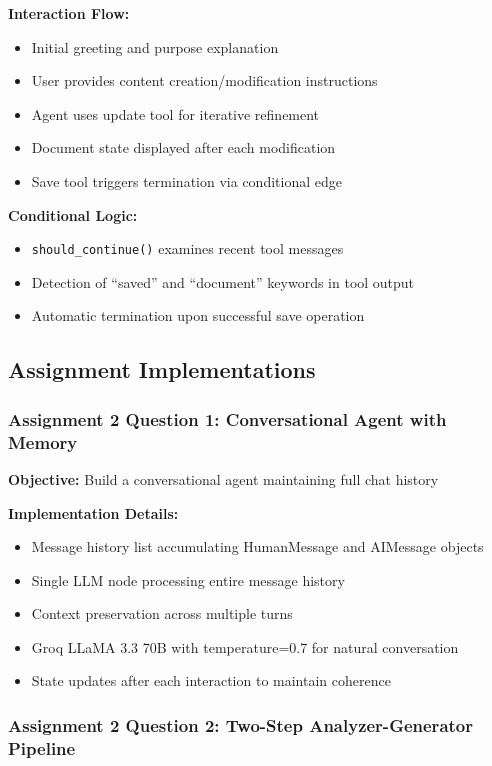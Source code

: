 \documentclass[12pt,a4paper]{article}
\begin{document}
\textbf{Interaction Flow:}
\begin{itemize}
    \item Initial greeting and purpose explanation
    \item User provides content creation/modification instructions
    \item Agent uses update tool for iterative refinement
    \item Document state displayed after each modification
    \item Save tool triggers termination via conditional edge
\end{itemize}

\textbf{Conditional Logic:}
\begin{itemize}
    \item \texttt{should\_continue()} examines recent tool messages
    \item Detection of ``saved'' and ``document'' keywords in tool output
    \item Automatic termination upon successful save operation
\end{itemize}

\subsection{Assignment Implementations}

\subsubsection{Assignment 2 Question 1: Conversational Agent with Memory}

\textbf{Objective:} Build a conversational agent maintaining full chat history

\textbf{Implementation Details:}
\begin{itemize}
    \item Message history list accumulating HumanMessage and AIMessage objects
    \item Single LLM node processing entire message history
    \item Context preservation across multiple turns
    \item Groq LLaMA 3.3 70B with temperature=0.7 for natural conversation
    \item State updates after each interaction to maintain coherence
\end{itemize}

\subsubsection{Assignment 2 Question 2: Two-Step Analyzer-Generator Pipeline}
\end{document}
